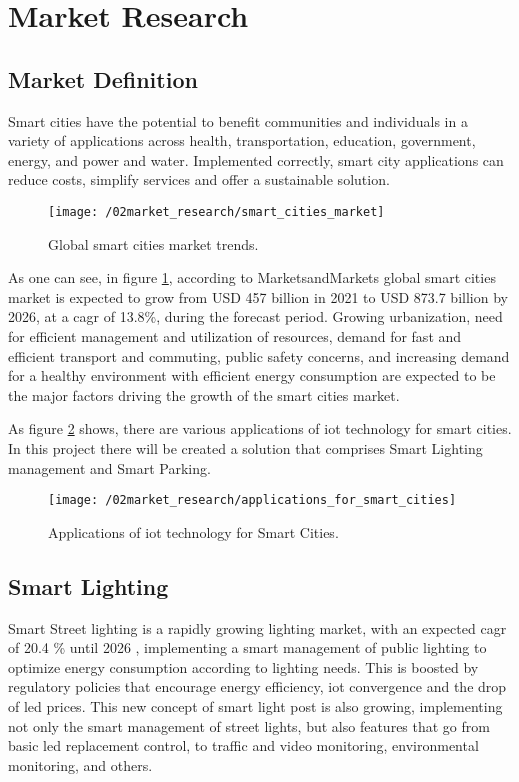 \section{Market Research}

\subsection{Market Definition}
Smart cities have the potential to benefit communities and individuals in a variety of applications across health, transportation, education, government, energy, and power and water. Implemented correctly, smart city applications can reduce costs, simplify services and offer a sustainable solution. \cite{smart_city_application_needs} 

\begin{figure}[ht]
	\centering
	\texttt{[image: /02market\_research/smart\_cities\_market]}
	\caption{Global smart cities market trends.}
	\label{fig:smart_city_growth}
\end{figure}

As one can see, in figure \ref{fig:smart_city_growth}, according to MarketsandMarkets \cite{smart_cities_market} global smart cities market is expected to grow from USD 457 billion in 2021 to USD 873.7 billion by 2026, at a \ac{cagr} of 13.8\%, during the forecast period. Growing urbanization, need for efficient management and utilization of resources, demand for fast and efficient transport and commuting, public safety concerns, and increasing demand for a healthy environment with efficient energy consumption are expected to be the major factors driving the growth of the smart cities market.

As figure \ref{fig:smart_cities_sols} shows, there are various applications of \ac{iot} technology for smart cities. In this project there will be created a solution that comprises Smart Lighting management and Smart Parking.

\begin{figure}[ht]
	\centering
	\texttt{[image: /02market\_research/applications\_for\_smart\_cities]}
	\caption{Applications of \ac{iot} technology for Smart Cities. \cite{smart_cities_solutions}}
	\label{fig:smart_cities_sols}
\end{figure}

\subsection{Smart Lighting}
Smart Street lighting is a rapidly growing lighting market, with an expected \ac{cagr} of 20.4 \% until 2026 \cite{smart_light_market}, implementing a smart management of public lighting to optimize energy consumption according to lighting needs. This is boosted by regulatory policies that encourage energy efficiency, \ac{iot} convergence and the drop of \ac{led} prices. This new concept of smart light post is also growing, implementing not only the smart management of street lights, but also features that go from basic \ac{led} replacement control, to traffic and video monitoring, environmental monitoring, and others.

